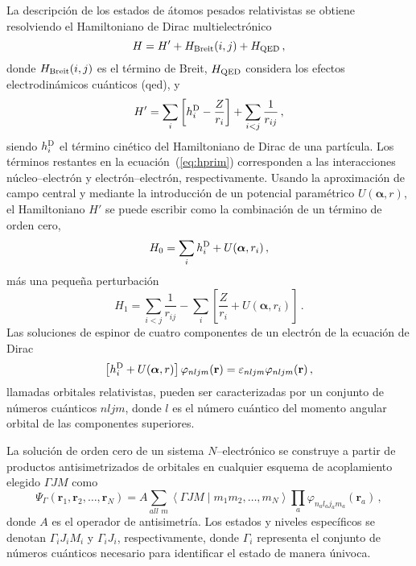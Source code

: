 La descripción de los estados de átomos pesados relativistas se 
obtiene resolviendo el Hamiltoniano de Dirac multielectrónico
\begin{equation}
 H = H' + H_{\mathrm{\mbox{\scriptsize Breit}}}(i,j) +
 H_{\mbox{\scriptsize QED}}\,,
\label{eq:htot}
\end{equation}
donde $H_{\mathrm{\mbox{\scriptsize Breit}}}(i,j)$ es el término de 
Breit, $H_{\mbox{\scriptsize QED}}$ considera los efectos 
electrodinámicos cuánticos (\acs{qed}), y
\begin{equation}
 H' = \sum_i \left[ h_i^{\mbox{\scriptsize D}} - \frac{Z}{r_i}\right]
 + \sum_{i<j}\frac{1}{r_{ij}}\,,
\label{eq:hprim}
\end{equation}
siendo $h_i^{\mbox{\scriptsize D}}$ el término cinético del 
Hamiltoniano de Dirac de una partícula. Los términos restantes en la
ecuación~(\ref{eq:hprim}) corresponden a las interacciones 
núcleo--electrón y electrón--electrón, respectivamente. Usando la 
aproximación de campo central y mediante la introducción de un potencial 
paramétrico $U(\boldsymbol{\alpha},r)$, el Hamiltoniano $H'$ se puede escribir como la 
combinación de un término de orden cero, 
\begin{equation}
 H_0 = \sum_i h_i^{\mbox{\scriptsize D}} + U(\boldsymbol{\alpha},r_i)\,,
\end{equation}
más una pequeña perturbación
\begin{equation}
 H_1 = \sum_{i<j}\frac{1}{r_{ij}}
 - \sum_i \left[ \frac{Z}{r_i} + U(\boldsymbol{\alpha},r_i) \right]\,.
\end{equation}
Las soluciones de espinor de cuatro componentes de un electrón de la 
ecuación de Dirac
\begin{equation}
\left[ h_i^{\mbox{\scriptsize D}} +U(\boldsymbol{\alpha},r) \right] \varphi_{nljm}(\mathbf{r}) 
= \varepsilon_{nljm} \varphi_{nljm}(\mathbf{r})\,,
\label{eq:ecuacionDirac}
\end{equation}
llamadas orbitales relativistas, pueden ser caracterizadas por un 
conjunto de números cuánticos $nljm$, donde $l$ es el número cuántico 
del momento angular orbital de las componentes superiores. 

La solución de orden cero de un sistema $N$--electrónico se construye a 
partir de productos antisimetrizados de orbitales en cualquier esquema 
de acoplamiento elegido $\Gamma JM$ como 
\begin{equation}
\Psi_{\Gamma}\left(\mathbf{r}_1, \mathbf{r}_2, \ldots, \mathbf{r}_N\right)=A \sum_{all\,\,m}\left\langle\Gamma J M \mid m_1 m_2, \ldots, m_{N}\right\rangle \prod_{a} \varphi_{n_a l_a j_a m_a}\left(\mathbf{r}_a\right)\,,
\end{equation}
donde $A$ es el operador de antisimetría. Los estados y niveles 
específicos se denotan $\Gamma_iJ_iM_i$ y $\Gamma_iJ_i$, respectivamente,
donde $\Gamma_i$ representa el conjunto de números cuánticos necesario 
para identificar el estado de manera únivoca. 

